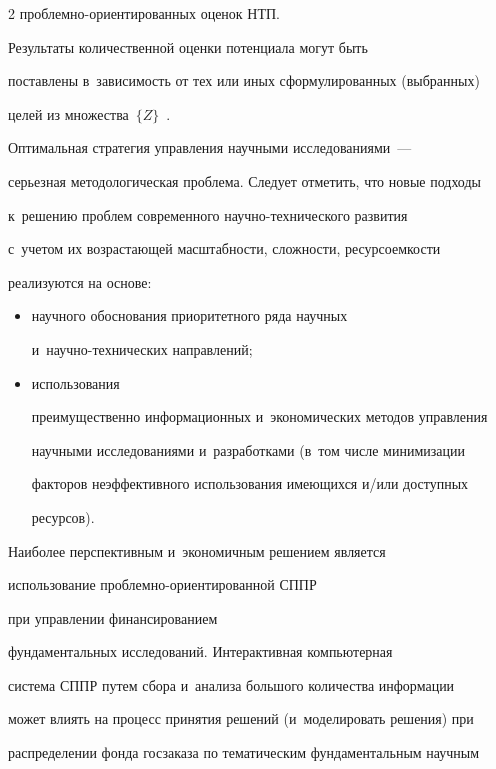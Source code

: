 \begin{multicols}{2}
проб\-лем\-но-ори\-ен\-ти\-ро\-ван\-ных оценок НТП. 

Результаты количественной оценки потенциала могут быть 

поставлены в~зависимость от тех или иных сформулированных (выбранных) 

целей из множества~$\{Z\}$~\cite{4-sun}. 



     Оптимальная стратегия управления научными исследованиями~--- 

серьезная методологическая проблема. Следует отметить, что новые подходы 

к~решению проб\-лем современного на\-уч\-но-тех\-ни\-че\-ско\-го развития 

с~учетом их возрастающей масштабности, сложности, ресурсоемкости 

реализуются на основе: 

\begin{itemize}

\item научного обоснования приоритетного ряда научных 

и~на\-уч\-но-тех\-ни\-че\-ских направлений; 

\item использования 

преимущественно информационных и~экономических методов управления\linebreak 

научными исследованиями и~разработками (в~том чис\-ле минимизации 

факторов неэффективного использования имеющихся и/или доступных 

ресурсов).

\end{itemize}



 Наиболее перспективным и~экономичным решением является 

использование проб\-лем\-но-ори\-ен\-ти\-ро\-ван\-ной СППР 

при управлении финанси\-рованием 

фундаментальных исследований.  \mbox{Интерактивная} компьютерная 

система СППР путем сбора и~анализа большого количества информации 

может влиять на процесс принятия решений (и~моделировать решения) при 

распределении фонда госзаказа по тематическим фундаментальным научным 


\end{multicols}
